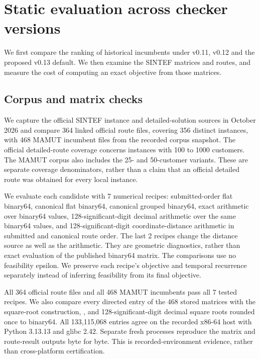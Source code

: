 \section{Static evaluation across checker versions}\label{sec:evidence}
We first compare the ranking of historical incumbents under v0.11, v0.12 and the proposed v0.13 default. We then examine the SINTEF matrices and routes, and measure the cost of computing an exact objective from those matrices.



\subsection{Corpus and matrix checks}
We capture the official SINTEF instance and detailed-solution sources in October 2026 and compare 364 linked official route files, covering 356 distinct instances, with 468 MAMUT incumbent files from the recorded corpus snapshot. The official detailed-route coverage concerns instances with 100 to 1000 customers. The MAMUT corpus also includes the 25- and 50-customer variants. These are separate coverage denominators, rather than a claim that an official detailed route was obtained for every local instance.

We evaluate each candidate with 7 numerical recipes: submitted-order flat binary64, canonical flat binary64, canonical grouped binary64, exact arithmetic over binary64 values, 128-significant-digit decimal arithmetic over the same binary64 values, and 128-significant-digit coordinate-distance arithmetic in submitted and canonical route order. The last 2 recipes change the distance source as well as the arithmetic. They are geometric diagnostics, rather than exact evaluation of the published binary64 matrix. The comparisons use no feasibility epsilon. We preserve each recipe's objective and temporal recurrence separately instead of inferring feasibility from its final objective.

All 364 official route files and all 468 MAMUT incumbents pass all 7 tested recipes. We also compare every directed entry of the 468 stored matrices with the square-root construction, , and 128-significant-digit decimal square roots rounded once to binary64. All 133,115,068 entries agree on the recorded x86-64 host with Python 3.13.13 and glibc 2.42. Separate fresh processes reproduce the matrix and route-result outputs byte for byte. This is recorded-environment evidence, rather than cross-platform certification.


